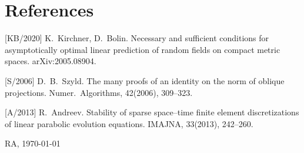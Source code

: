 \documentclass[12pt]{article}
\newcommand{\norm}[2]{\|#1\|_{#2}}
\begin{document}
	
%	
%	
%	
%	
%	
	 
	

	\section*{References}

	[KB/2020]
	K.~Kirchner, D.~Bolin.
	Necessary and sufficient conditions for asymptotically optimal linear prediction of random fields on compact metric spaces.
	arXiv:2005.08904.
	
	[S/2006]
	D.~B.~Szyld.
	The many proofs of an identity on the norm of oblique projections.
	Numer.~Algorithms, 42(2006), 309--323.
	
	[A/2013]
	R.~Andreev.
	Stability of sparse space--time finite element discretizations of linear parabolic
	evolution equations.
	IMAJNA, 33(2013), 242--260.
	
	\vfill
	\hfill
	RA, \today
\end{document}
